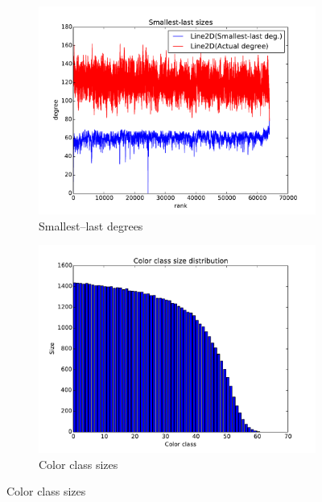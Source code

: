 \documentclass[oneside, titlepage]{scrartcl}
\begin{document}
\begin{figure}[!h]
\begin{subfigure}{0.5\textwidth}
	\centering
	\includegraphics[width=0.9\linewidth]{figures/ordering10.pdf}
	\caption{Smallest--last degrees}
\end{subfigure}%
\begin{subfigure}{0.5\textwidth}
	\centering
	\includegraphics[width=0.9\linewidth]{figures/colors10.pdf}
	\caption{Color class sizes}
\end{subfigure}


\end{figure}
\end{document}
